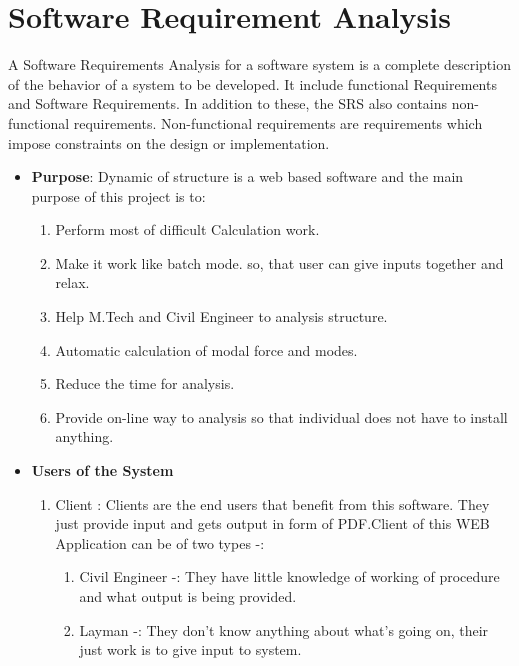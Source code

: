 \section{Software Requirement Analysis}

A Software Requirements Analysis for a software system is a complete 
description of the behavior of a system to be developed. It include functional Requirements
and Software Requirements. In addition to these, the SRS also contains 
non-functional requirements. Non-functional requirements are 
requirements which impose constraints on the design or implementation.
\begin{itemize}
\item{\bf Purpose}: Dynamic of structure is a web based software and the 
main purpose of this project is to:
\begin{enumerate}
\item Perform most of difficult Calculation work.
\item Make it work like batch mode. so, that user can give inputs 
together and relax.
\item Help M.Tech and Civil Engineer to analysis structure.
\item Automatic calculation of modal force and modes.
\item Reduce the time for analysis.
\item Provide on-line way to analysis so that individual does not have to 
install anything.
\end{enumerate}

\item{\bf Users of the System}
\begin{enumerate} 
\item Client : Clients are the end users that benefit from this software.
They just provide input and gets output in form of PDF.Client of this 
WEB Application can be of two types -:
\begin{enumerate}
\item Civil Engineer -: They have little knowledge of working of procedure
and what output is being provided.
\item Layman -: They don't know anything about what's going on, their just 
work is to give input to system.   
 
\end{enumerate}
\end{enumerate}
\end{itemize}

